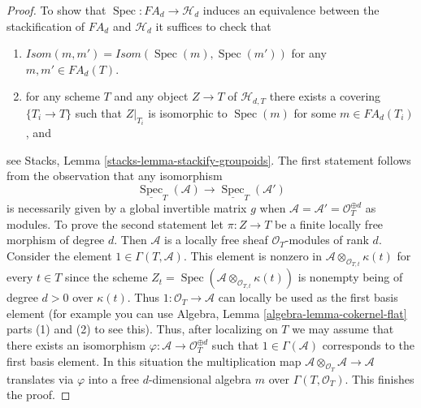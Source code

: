 \documentclass{stacks-project}
\theoremstyle{plain}
\theoremstyle{definition}
\theoremstyle{remark}
\numberwithin{equation}{subsection}
\def\Spec{\mathop{\mathrm{Spec}}}
\begin{document}
\begin{proof}
\medskip\noindent
To show that $\Spec : FA_d \to \mathcal{H}_d$ induces an equivalence
between the stackification of $FA_d$ and $\mathcal{H}_d$ it suffices to
check that
\begin{enumerate}
\item $\mathit{Isom}(m, m') = \mathit{Isom}(\Spec(m), \Spec(m'))$
for any $m, m' \in FA_d(T)$.
\item for any scheme $T$ and any object $Z \to T$ of $\mathcal{H}_{d, T}$
there exists a covering $\{T_i \to T\}$ such that $Z|_{T_i}$ is
isomorphic to $\Spec(m)$ for some $m \in FA_d(T_i)$, and
\end{enumerate}
see
Stacks, Lemma \ref{stacks-lemma-stackify-groupoids}.
The first statement follows from the observation that any isomorphism
$$
\underline{\Spec}_T(\mathcal{A})
\longrightarrow
\underline{\Spec}_T(\mathcal{A}')
$$
is necessarily given by a global invertible matrix $g$ when
$\mathcal{A} = \mathcal{A}' = \mathcal{O}_T^{\oplus d}$ as modules.
To prove the second statement let $\pi : Z \to T$ be a finite
locally free morphism of degree $d$. Then $\mathcal{A}$ is a locally
free sheaf $\mathcal{O}_T$-modules of rank $d$.
Consider the element $1 \in \Gamma(T, \mathcal{A})$. This element is
nonzero in $\mathcal{A} \otimes_{\mathcal{O}_{T, t}} \kappa(t)$
for every $t \in T$ since the scheme
$Z_t = \Spec(\mathcal{A} \otimes_{\mathcal{O}_{T, t}} \kappa(t))$
is nonempty being of degree $d > 0$ over $\kappa(t)$. Thus
$1 : \mathcal{O}_T \to \mathcal{A}$ can locally be used as the first
basis element (for example you can use
Algebra, Lemma \ref{algebra-lemma-cokernel-flat} parts (1) and (2)
to see this). Thus, after localizing on
$T$ we may assume that there exists an isomorphism
$\varphi : \mathcal{A} \to \mathcal{O}_T^{\oplus d}$
such that $1 \in \Gamma(\mathcal{A})$ corresponds to the first basis element.
In this situation the multiplication map
$\mathcal{A} \otimes_{\mathcal{O}_T} \mathcal{A} \to \mathcal{A}$
translates via $\varphi$ into a free $d$-dimensional algebra $m$ over
$\Gamma(T, \mathcal{O}_T)$. This finishes the proof.
\end{proof}
\end{document}

